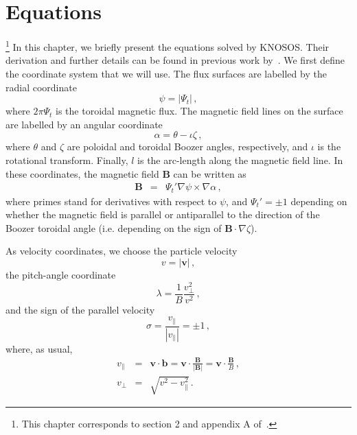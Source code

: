 \chapter{Equations}\label{CHAP_EQ}

\footnote{This chapter corresponds to section 2 and appendix A of~\citep{velasco2019knosos}.}
In this chapter, we briefly present the equations solved by {\ttfamily KNOSOS}. Their derivation and further details can be found in previous work by~\citep{calvo2017sqrtnu,calvo2018jpp}. We first define  the coordinate system that we will use. The flux surfaces are labelled by the radial coordinate
\begin{equation}
\psi=|\Psi_t|\,,
\end{equation}
where $2\pi\Psi_t$ is the toroidal magnetic flux.  The magnetic field lines on the surface are labelled by an angular coordinate
\begin{equation}
\alpha = \theta -\iota\zeta\,,
\end{equation}
where $\theta$ and $\zeta$ are poloidal and toroidal Boozer angles, respectively, and $\iota$ is the rotational transform. Finally, $l$ is the arc-length along the magnetic field line. In these coordinates, the magnetic field $\mathbf{B}$ can be written as
\begin{eqnarray}
\mathbf{B}&=&\Psi_t'\nabla \psi \times\nabla\alpha\,,
\end{eqnarray}
where primes stand for derivatives with respect to $\psi$, and $\Psi_t'=\pm 1$ depending on whether the magnetic field is parallel or antiparallel to the direction of the Boozer toroidal angle (i.e. depending on the sign of $\mathbf{B}\cdot\nabla\zeta$).

As velocity coordinates, we choose the particle velocity
\begin{equation}
v = |\mathbf{v}|\,,
\end{equation}
the pitch-angle coordinate
\begin{equation}
\lambda=\frac{1}{B}\frac{v_\perp^2}{v^2}\,,
\end{equation}
and the sign of the parallel velocity
\begin{equation}
\sigma= \frac{v_\parallel}{|v_\parallel|}=\pm 1\,,
\end{equation}
where, as usual,
\begin{eqnarray}
v_\parallel &=& \mathbf{v}\cdot \mathbf{b} = \mathbf{v}\cdot\frac{\mathbf{B}}{|\mathbf{B}|}=  \mathbf{v}\cdot\frac{\mathbf{B}}{B}\,,\nonumber  \\
v_\perp &=& \sqrt{v^2-v_\parallel^2}\,.
\end{eqnarray}

